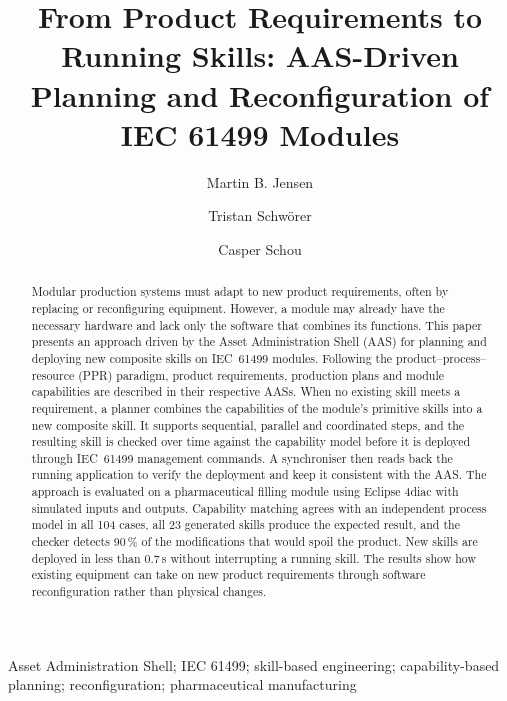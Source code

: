 \documentclass[5p,times,procedia]{elsarticle}
\begin{document}
\begin{frontmatter}

%

\title{From Product Requirements to Running Skills: AAS-Driven Planning and Reconfiguration of IEC 61499 Modules}

\author[a]{Martin B. Jensen}
\author[a]{Tristan Schwörer}
\author[a]{Casper Schou}

\address[a]{Aalborg University, Fibigerstræde 14, Aalborg 9220, Denmark}


\begin{abstract}
Modular production systems must adapt to new product requirements, often by replacing or reconfiguring equipment. However, a module may already have the necessary hardware and lack only the software that combines its functions. This paper presents an approach driven by the Asset Administration Shell (AAS) for planning and deploying new composite skills on IEC~61499 modules. Following the product--process--resource (PPR) paradigm, product requirements, production plans and module capabilities are described in their respective AASs. When no existing skill meets a requirement, a planner combines the capabilities of the module's primitive skills into a new composite skill. It supports sequential, parallel and coordinated steps, and the resulting skill is checked over time against the capability model before it is deployed through IEC~61499 management commands. A synchroniser then reads back the running application to verify the deployment and keep it consistent with the AAS. The approach is evaluated on a pharmaceutical filling module using Eclipse 4diac with simulated inputs and outputs. Capability matching agrees with an independent process model in all 104 cases, all 23 generated skills produce the expected result, and the checker detects 90\,\% of the modifications that would spoil the product. New skills are deployed in less than 0.7\,s without interrupting a running skill. The results show how existing equipment can take on new product requirements through software reconfiguration rather than physical changes.
\end{abstract}

\begin{keyword}
Asset Administration Shell; IEC 61499; skill-based engineering; capability-based planning; reconfiguration; pharmaceutical manufacturing
\end{keyword}
\end{frontmatter}
\end{document}
